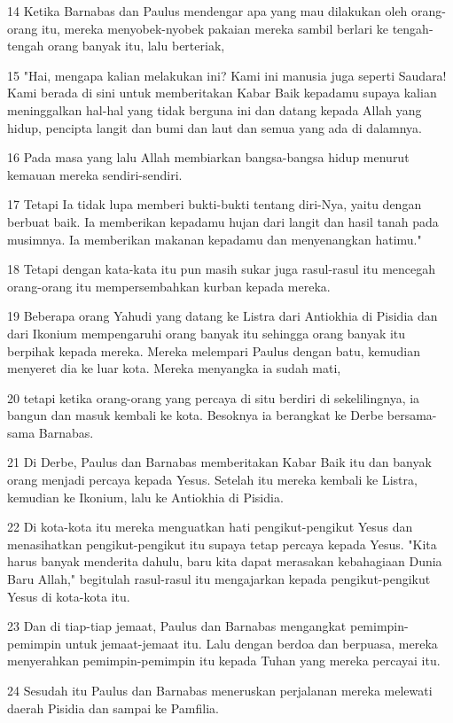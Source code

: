 \par 14 Ketika Barnabas dan Paulus mendengar apa yang mau dilakukan oleh orang-orang itu, mereka menyobek-nyobek pakaian mereka sambil berlari ke tengah-tengah orang banyak itu, lalu berteriak,
\par 15 "Hai, mengapa kalian melakukan ini? Kami ini manusia juga seperti Saudara! Kami berada di sini untuk memberitakan Kabar Baik kepadamu supaya kalian meninggalkan hal-hal yang tidak berguna ini dan datang kepada Allah yang hidup, pencipta langit dan bumi dan laut dan semua yang ada di dalamnya.
\par 16 Pada masa yang lalu Allah membiarkan bangsa-bangsa hidup menurut kemauan mereka sendiri-sendiri.
\par 17 Tetapi Ia tidak lupa memberi bukti-bukti tentang diri-Nya, yaitu dengan berbuat baik. Ia memberikan kepadamu hujan dari langit dan hasil tanah pada musimnya. Ia memberikan makanan kepadamu dan menyenangkan hatimu."
\par 18 Tetapi dengan kata-kata itu pun masih sukar juga rasul-rasul itu mencegah orang-orang itu mempersembahkan kurban kepada mereka.
\par 19 Beberapa orang Yahudi yang datang ke Listra dari Antiokhia di Pisidia dan dari Ikonium mempengaruhi orang banyak itu sehingga orang banyak itu berpihak kepada mereka. Mereka melempari Paulus dengan batu, kemudian menyeret dia ke luar kota. Mereka menyangka ia sudah mati,
\par 20 tetapi ketika orang-orang yang percaya di situ berdiri di sekelilingnya, ia bangun dan masuk kembali ke kota. Besoknya ia berangkat ke Derbe bersama-sama Barnabas.
\par 21 Di Derbe, Paulus dan Barnabas memberitakan Kabar Baik itu dan banyak orang menjadi percaya kepada Yesus. Setelah itu mereka kembali ke Listra, kemudian ke Ikonium, lalu ke Antiokhia di Pisidia.
\par 22 Di kota-kota itu mereka menguatkan hati pengikut-pengikut Yesus dan menasihatkan pengikut-pengikut itu supaya tetap percaya kepada Yesus. "Kita harus banyak menderita dahulu, baru kita dapat merasakan kebahagiaan Dunia Baru Allah," begitulah rasul-rasul itu mengajarkan kepada pengikut-pengikut Yesus di kota-kota itu.
\par 23 Dan di tiap-tiap jemaat, Paulus dan Barnabas mengangkat pemimpin-pemimpin untuk jemaat-jemaat itu. Lalu dengan berdoa dan berpuasa, mereka menyerahkan pemimpin-pemimpin itu kepada Tuhan yang mereka percayai itu.
\par 24 Sesudah itu Paulus dan Barnabas meneruskan perjalanan mereka melewati daerah Pisidia dan sampai ke Pamfilia.
